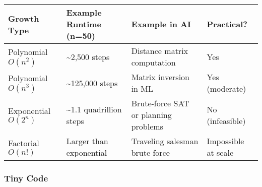 \documentclass[
  letterpaper,
  DIV=11,
  numbers=noendperiod]{scrreprt}
\begin{document}
\begin{longtable}[]{@{}
  >{\raggedright\arraybackslash}p{}
  >{\raggedright\arraybackslash}p{}
  >{\raggedright\arraybackslash}p{}
  >{\raggedright\arraybackslash}p{}@{}}
\toprule\noalign{}
\begin{minipage}[b]{\linewidth}\raggedright
Growth Type
\end{minipage} & \begin{minipage}[b]{\linewidth}\raggedright
Example Runtime (n=50)
\end{minipage} & \begin{minipage}[b]{\linewidth}\raggedright
Example in AI
\end{minipage} & \begin{minipage}[b]{\linewidth}\raggedright
Practical?
\end{minipage} \\
\midrule\noalign{}
\endhead
\bottomrule\noalign{}
\endlastfoot
Polynomial \(O(n^2)\) & \textasciitilde2,500 steps & Distance matrix
computation & Yes \\
Polynomial \(O(n^3)\) & \textasciitilde125,000 steps & Matrix inversion
in ML & Yes (moderate) \\
Exponential \(O(2^n)\) & \textasciitilde1.1 quadrillion steps &
Brute-force SAT or planning problems & No (infeasible) \\
Factorial \(O(n!)\) & Larger than exponential & Traveling salesman brute
force & Impossible at scale \\
\end{longtable}

\subsubsection{Tiny Code}\label{tiny-code-33}
\end{document}
